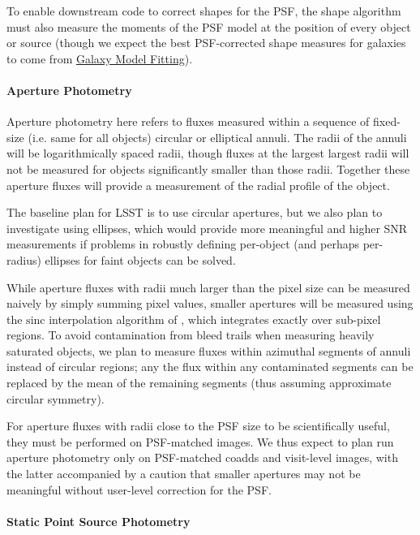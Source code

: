 To enable downstream code to correct shapes for the PSF, the shape algorithm must also measure the moments of the PSF model at the position of every object or source (though we expect the best PSF-corrected shape measures for galaxies to come from \hyperref[sec:acGalaxyModels]{Galaxy Model Fitting}).

\paragraph{Aperture Photometry}
\label{sec:acAperturePhotometry}

Aperture photometry here refers to fluxes measured within a sequence of fixed-size (i.e. same for all objects) circular or elliptical annuli.  The radii of the annuli will be logarithmically spaced radii, though fluxes at the largest largest radii will not be measured for objects significantly smaller than those radii.  Together these aperture fluxes will provide a measurement of the radial profile of the object.

The baseline plan for LSST is to use circular apertures, but we also plan to investigate using ellipses, which would provide more meaningful and higher SNR measurements if problems in robustly defining per-object (and perhaps per-radius) ellipses for faint objects can be solved.

While aperture fluxes with radii much larger than the pixel size can be measured naively by simply summing pixel values, smaller apertures will be measured using the $\mathrm{sinc}$ interpolation algorithm of \cite{Bickerton13}, which integrates exactly over sub-pixel regions.  To avoid contamination from bleed trails when measuring heavily saturated objects, we plan to measure fluxes within azimuthal segments of annuli instead of circular regions; any the flux within any contaminated segments can be replaced by the mean of the remaining segments (thus assuming approximate circular symmetry).

For aperture fluxes with radii close to the PSF size to be scientifically useful, they must be performed on PSF-matched images.  We thus expect to plan run aperture photometry only on PSF-matched coadds and visit-level images, with the latter accompanied by a caution that smaller apertures may not be meaningful without user-level correction for the PSF.

\paragraph{Static Point Source Photometry}
\label{sec:acStaticPointSourceModels}

